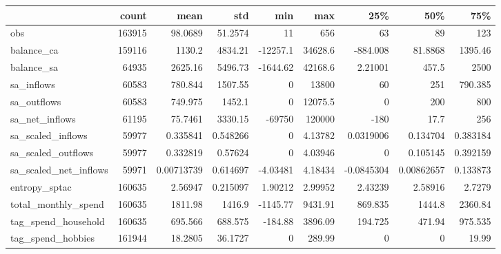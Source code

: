 \begin{tabular}{lrrrrrrrr}
\toprule
                         &   count &          mean &         std &          min &          max &          25\% &           50\% &         75\% \\
\midrule
 obs                     &  163915 &   98.0689     &   51.2574   &     11       &    656       &   63         &   89          &  123        \\
 balance\_ca              &  159116 & 1130.2        & 4834.21     & -12257.1     &  34628.6     & -884.008     &   81.8868     & 1395.46     \\
 balance\_sa              &   64935 & 2625.16       & 5496.73     &  -1644.62    &  42168.6     &    2.21001   &  457.5        & 2500        \\
 sa\_inflows              &   60583 &  780.844      & 1507.55     &      0       &  13800       &   60         &  251          &  790.385    \\
 sa\_outflows             &   60583 &  749.975      & 1452.1      &      0       &  12075.5     &    0         &  200          &  800        \\
 sa\_net\_inflows          &   61195 &   75.7461     & 3330.15     & -69750       & 120000       & -180         &   17.7        &  256        \\
 sa\_scaled\_inflows       &   59977 &    0.335841   &    0.548266 &      0       &      4.13782 &    0.0319006 &    0.134704   &    0.383184 \\
 sa\_scaled\_outflows      &   59977 &    0.332819   &    0.57624  &      0       &      4.03946 &    0         &    0.105145   &    0.392159 \\
 sa\_scaled\_net\_inflows   &   59971 &    0.00713739 &    0.614697 &     -4.03481 &      4.18434 &   -0.0845304 &    0.00862657 &    0.133873 \\
 entropy\_sptac           &  160635 &    2.56947    &    0.215097 &      1.90212 &      2.99952 &    2.43239   &    2.58916    &    2.7279   \\
 total\_monthly\_spend     &  160635 & 1811.98       & 1416.9      &  -1145.77    &   9431.91    &  869.835     & 1444.8        & 2360.84     \\
 tag\_spend\_household     &  160635 &  695.566      &  688.575    &   -184.88    &   3896.09    &  194.725     &  471.94       &  975.535    \\
 tag\_spend\_hobbies       &  161944 &   18.2805     &   36.1727   &      0       &    289.99    &    0         &    0          &   19.99     \\

\end{tabular}

